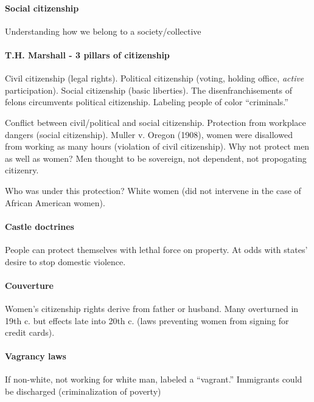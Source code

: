 \paragraph{Social citizenship} Understanding how we belong to a society/collective

\paragraph{T.H. Marshall - 3 pillars of citizenship} Civil citizenship (legal rights). Political citizenship (voting, holding office, \textit{active} participation). Social citizenship (basic liberties). The disenfranchisements of felons circumvents political citizenship. Labeling people of color ``criminals.''

Conflict between civil/political and social citizenship. Protection from workplace dangers (social citizenship). Muller v. Oregon (1908), women were disallowed from working as many hours (violation of civil citizenship). Why not protect men as well as women? Men thought to be sovereign, not dependent, not propogating citizenry.

Who was under this protection? White women (did not intervene in the case of African American women).

\paragraph{Castle doctrines} People can protect themselves with lethal force on property. At odds with states' desire to stop domestic violence.

\paragraph{Couverture} Women's citizenship rights derive from father or husband. Many overturned in 19th c. but effects late into 20th c. (laws preventing women from signing for credit cards).

\paragraph{Vagrancy laws} If non-white, not working for white man, labeled a ``vagrant.'' Immigrants could be discharged (criminalization of poverty)